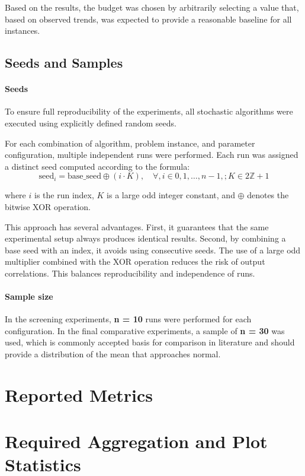 \documentclass[12pt,a4paper]{report}
\begin{document}
Based on the results, the budget was chosen by arbitrarily selecting a value that, based on observed trends, was expected to provide a reasonable baseline for all instances.

\subsection{Seeds and Samples}

\paragraph{Seeds} To ensure full reproducibility of the experiments, all stochastic algorithms were executed using explicitly defined random seeds.

For each combination of algorithm, problem instance, and parameter configuration, multiple independent runs were performed. Each run was assigned a distinct seed computed according to the formula:
\[
\text{seed}_i = \text{base\_seed} \oplus (i \cdot K), \quad \forall, i \in {0,1,\dots,n-1}, ; K \in 2\mathbb{Z}+1
\]

where \(i\) is the run index, \(K\) is a large odd integer constant, and \(\oplus\) denotes the bitwise XOR operation.

This approach has several advantages. First, it guarantees that the same experimental setup always produces identical results. Second, by combining a base seed with an index, it avoids using consecutive seeds. The use of a large odd multiplier combined with the XOR operation reduces the risk of output correlations. This balances reproducibility and independence of runs.

\paragraph{Sample size} In the screening experiments, \textbf{n = 10} runs were performed for each configuration. In the final comparative experiments, a sample of \textbf{n = 30} was used, which is commonly accepted basis for comparison in literature and should provide a distribution of the mean that approaches normal.

\section{Reported Metrics}

\section{Required Aggregation and Plot Statistics}
\end{document}
